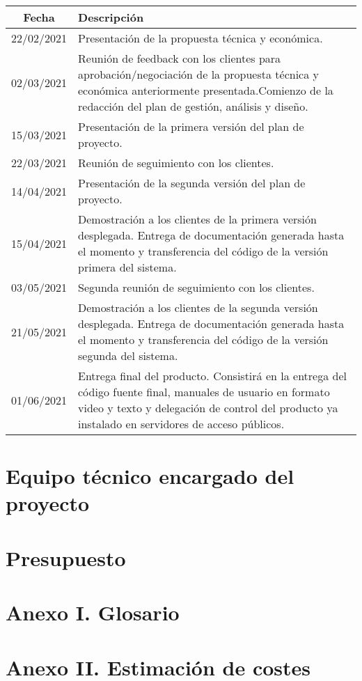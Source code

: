 \documentclass{article}
\begin{document}
\begin{table}[H]
    \centering
    \begin{tabular}{| c | p{30em} |}
    \hline
        Fecha &  Descripción  \\ 
        \hline
        22/02/2021 & Presentación de la propuesta técnica y económica.  \\ 
        \hline
        02/03/2021 & Reunión de feedback con los clientes para aprobación/negociación de la propuesta técnica y económica anteriormente presentada.Comienzo de la redacción del plan de gestión, análisis y diseño. \\ 
        \hline
        15/03/2021 & Presentación de la primera versión del plan de proyecto.\\ \hline
        22/03/2021 & Reunión de seguimiento con los clientes. \\ 
        \hline
        14/04/2021 & Presentación de la segunda versión del plan de proyecto. \\ \hline
        15/04/2021 & Demostración a los clientes de la primera versión desplegada.
        Entrega de documentación generada hasta el momento y transferencia del código de la versión primera del sistema.\\ 
        \hline
        03/05/2021 & Segunda reunión de seguimiento con los clientes. \\ 
        \hline
        21/05/2021 & Demostración a los clientes de la segunda versión desplegada.
        Entrega de documentación generada hasta el momento y transferencia del código de la versión segunda del sistema.\\ 
        \hline
        01/06/2021 & Entrega final del producto. Consistirá en la entrega del código fuente final, manuales de usuario en formato video y texto y delegación de control del producto ya instalado en servidores de acceso públicos.\\ \hline
    \end{tabular}
\end{table}

\section{Equipo técnico encargado del proyecto}

\section{Presupuesto}

\section*{Anexo I. Glosario}

\section*{Anexo II. Estimación de costes}

\end{document}
